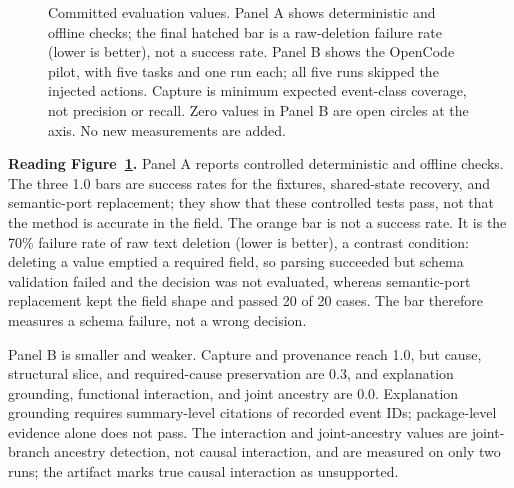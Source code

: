 \documentclass[11pt]{article}
\begin{document}
\begin{figure}[t]
\caption{Committed evaluation values. Panel A shows deterministic and offline checks; the final hatched bar is a raw-deletion failure rate (lower is better), not a success rate. Panel B shows the OpenCode pilot, with five tasks and one run each; all five runs skipped the injected actions. Capture is minimum expected event-class coverage, not precision or recall. Zero values in Panel B are open circles at the axis. No new measurements are added.}
\label{fig:bench}
\end{figure}

\noindent\textbf{Reading Figure~\ref{fig:bench}.} Panel A reports controlled deterministic and offline checks. The three 1.0 bars are success rates for the fixtures, shared-state recovery, and semantic-port replacement; they show that these controlled tests pass, not that the method is accurate in the field. The orange bar is not a success rate. It is the 70\% failure rate of raw text deletion (lower is better), a contrast condition: deleting a value emptied a required field, so parsing succeeded but schema validation failed and the decision was not evaluated, whereas semantic-port replacement kept the field shape and passed 20 of 20 cases. The bar therefore measures a schema failure, not a wrong decision.

\vspace{1em}

Panel B is smaller and weaker. Capture and provenance reach 1.0, but cause, structural slice, and required-cause preservation are 0.3, and explanation grounding, functional interaction, and joint ancestry are 0.0. Explanation grounding requires summary-level citations of recorded event IDs; package-level evidence alone does not pass. The interaction and joint-ancestry values are joint-branch ancestry detection, not causal interaction, and are measured on only two runs; the artifact marks true causal interaction as unsupported. 
\end{document}

